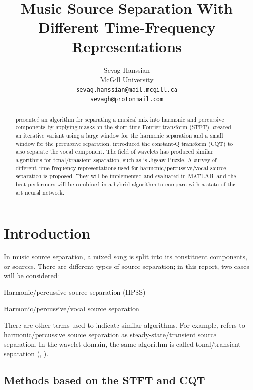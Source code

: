 \documentclass[10pt,letter]{article}
\title{Music Source Separation With Different Time-Frequency Representations}
\author{Sevag Hanssian \\
  McGill University \\
 \texttt{sevag.hanssian@mail.mcgill.ca} \\
 \texttt{sevagh@protonmail.com}}
\date{}
\newenvironment{tight_enumerate}{
\begin{enumerate}
\setlength{\itemsep}{0pt}
\setlength{\parskip}{0pt}
}{\end{enumerate}}
\begin{document}
\maketitle

\begin{abstract}
	\citet{fitzgerald1} presented an algorithm for separating a musical mix into harmonic and percussive components by applying masks on the short-time Fourier transform (STFT). \citet{driedger} created an iterative variant using a large window for the harmonic separation and a small window for the percussive separation. \citet{fitzgerald2} introduced the constant-Q transform (CQT) to also separate the vocal component. The field of wavelets has produced similar algorithms for tonal/transient separation, such as \citet{tfjigsaw}'s Jigsaw Puzzle. A survey of different time-frequency representations used for harmonic/percussive/vocal source separation is proposed. They will be implemented and evaluated in MATLAB, and the best performers will be combined in a hybrid algorithm to compare with a state-of-the-art neural network.
\end{abstract}

\section{Introduction}
\label{sec:intro}

In music source separation, a mixed song is split into its constituent components, or sources. There are different types of source separation; in this report, two cases will be considered:

\begin{tight_enumerate}
	\vspace{-0.5em}
	\item
		Harmonic/percussive source separation (HPSS)
	\item
		Harmonic/percussive/vocal source separation
\end{tight_enumerate}

There are other terms used to indicate similar algorithms. For example, \citet{bayarres} refers to harmonic/percussive source separation as steady-state/transient source separation. In the wavelet domain, the same algorithm is called tonal/transient separation (\cite{tfjigsaw}, \cite{wmdct}).

\subsection{Methods based on the STFT and CQT}
\end{document}
